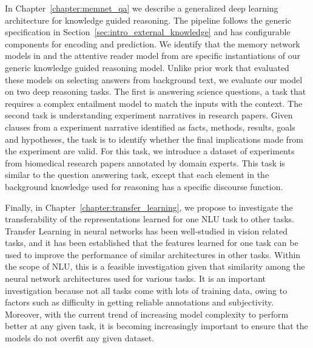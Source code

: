 In Chapter~\ref{chapter:memnet_qa} we describe a generalized deep learning architecture for knowledge guided reasoning.
The pipeline follows the generic specification in Section~\ref{sec:intro_external_knowledge} and has configurable components
for encoding and prediction. We identify that the memory network models in \cite{weston2014memory,Sukhbaatar2015EndToEndMN,Xiong2016DynamicMN}
and the attentive reader model from \cite{hermann2015teaching} are specific instantiations of our generic knowledge guided reasoning model.
Unlike prior work that evaluated these models on selecting answers from background text, we evaluate our model on two deep reasoning tasks. The first is
answering science questions, a task that requires a complex entailment model to match the inputs with the context. The second task is
understanding experiment narratives in research papers. Given clauses from a experiment narrative identified as facts, methods,
results, goals and hypotheses, the task is to identify whether the final implications made from the experiment are valid. For this task,
we introduce a dataset of experiments from biomedical research papers annotated by domain experts. This task is similar to the question answering 
task, except that each element in the background knowledge used for reasoning has a specific discourse function.

Finally, in Chapter~\ref{chapter:transfer_learning}, we propose to investigate the transferability of the representations learned for one NLU task to other tasks.
Transfer Learning in neural networks has been well-studied in vision related tasks, and it has been established that the features learned for one task can be
used to improve the performance of similar architectures in other tasks. Within the scope of NLU, this is a feasible investigation given that similarity
among the neural network architectures used for various tasks. It is an important investigation because not all tasks come with lots of training data, owing to factors
such as difficulty in getting reliable annotations and subjectivity. Moreover, with the current trend of increasing model complexity to perform better at any given task,
it is becoming increasingly important to ensure that the models do not overfit any given dataset.